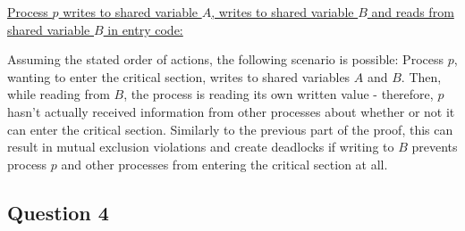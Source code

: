 \documentclass{article}
\begin{document}
\uline{Process \mbox{$p$} writes to shared variable \mbox{$A$},
writes to shared variable \mbox{$B$} and reads from shared variable
\mbox{$B$} in entry code:}

Assuming the stated order of actions, the following scenario is possible:
Process $p$, wanting to enter the critical section, writes to shared
variables $A$ and $B$. Then, while reading from $B$, the process
is reading its own written value - therefore, $p$ hasn't actually
received information from other processes about whether or not it
can enter the critical section. Similarly to the previous part of
the proof, this can result in mutual exclusion violations and create
deadlocks if writing to $B$ prevents process $p$ and other processes
from entering the critical section at all.

\subsection*{Question 4}



%
%
%
\end{document}
